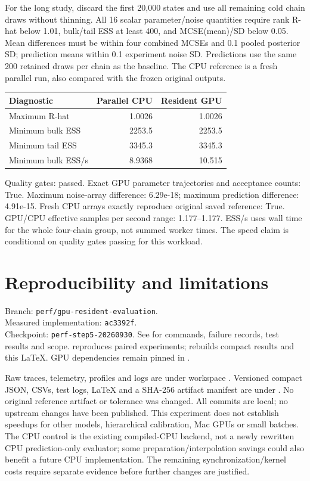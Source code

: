 \documentclass[11pt]{article}
\begin{document}
For the long study, discard the first 20,000 states and use all remaining cold
chain draws without thinning. All 16 scalar parameter/noise quantities require
rank R-hat below 1.01, bulk/tail ESS at least 400, and MCSE(mean)/SD below 0.05.
Mean differences must be within four combined MCSEs and 0.1 pooled posterior SD;
prediction means within 0.1 experiment noise SD. Predictions use the same 200
retained draws per chain as the baseline. The CPU reference is a fresh parallel
run, also compared with the frozen original outputs.
\begin{center}\begin{tabular}{lrr}\toprule
Diagnostic & Parallel CPU & Resident GPU\\\midrule
Maximum R-hat & 1.0026 & 1.0026\\
Minimum bulk ESS & 2253.5 & 2253.5\\
Minimum tail ESS & 3345.3 & 3345.3\\
Minimum bulk ESS/s & 8.9368 & 10.515\\
\bottomrule\end{tabular}\end{center}
Quality gates: passed. Exact GPU parameter trajectories and acceptance counts:
True. Maximum noise-array difference: 6.29e-18; maximum prediction difference:
4.91e-15. Fresh CPU arrays exactly reproduce original saved reference: True.
GPU/CPU effective samples per second range: 1.177--1.177. ESS/s uses wall time
for the whole four-chain group, not summed worker times. The speed claim is
conditional on quality gates passing for this workload.
\section*{Reproducibility and limitations}
\begingroup\raggedright
Branch: \texttt{perf/gpu-resident-evaluation}.\\
Measured implementation: \texttt{ac3392f}.\\
Checkpoint: \texttt{perf-step5-20260930}.
See  for commands, failure records, test results
and scope.  reproduces paired experiments;
 rebuilds compact results and this LaTeX.
GPU dependencies remain pinned in .

Raw traces, telemetry, profiles and logs are under workspace
. Versioned compact JSON, CSVs, test logs, LaTeX
and a SHA-256 artifact manifest are under .
No original reference artifact or tolerance was changed. All commits are local;
no upstream changes have been published. This experiment does not establish
speedups for other models, hierarchical calibration, Mac GPUs or small batches.
The CPU control is the existing compiled-CPU backend, not a newly rewritten
CPU prediction-only evaluator; some preparation/interpolation savings could
also benefit a future CPU implementation. The remaining synchronization/kernel
costs require separate evidence before
further changes are justified.
\par\endgroup
\end{document}
